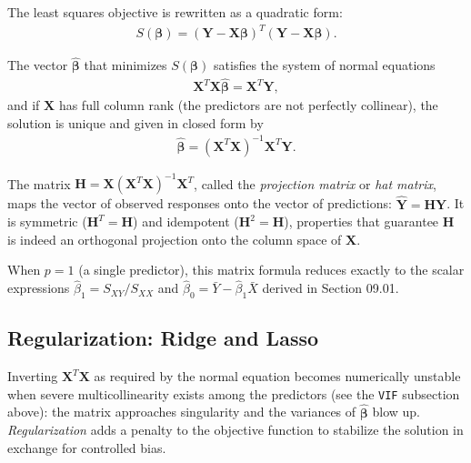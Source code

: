 The least squares objective is rewritten as a quadratic form:
\begin{align}
	S(\boldsymbol{\beta}) = (\mathbf{Y}-\mathbf{X}\boldsymbol{\beta})^T(\mathbf{Y}-\mathbf{X}\boldsymbol{\beta}).
\end{align}

\begin{teorema}
	The vector $\hat{\boldsymbol{\beta}}$ that minimizes $S(\boldsymbol{\beta})$ satisfies the system of normal equations
	\begin{align}
		\mathbf{X}^T\mathbf{X}\hat{\boldsymbol{\beta}} = \mathbf{X}^T\mathbf{Y},
	\end{align}
	and if $\mathbf{X}$ has full column rank (the predictors are not perfectly collinear), the solution is unique and given in closed form by
	\begin{align}
		\hat{\boldsymbol{\beta}} = (\mathbf{X}^T\mathbf{X})^{-1}\mathbf{X}^T\mathbf{Y}.
	\end{align}
\end{teorema}

\begin{definicion}
	The matrix $\mathbf{H}=\mathbf{X}(\mathbf{X}^T\mathbf{X})^{-1}\mathbf{X}^T$, called the \emph{projection matrix} or \emph{hat matrix}, maps the vector of observed responses onto the vector of predictions: $\hat{\mathbf{Y}}=\mathbf{H}\mathbf{Y}$. It is symmetric ($\mathbf{H}^T=\mathbf{H}$) and idempotent ($\mathbf{H}^2=\mathbf{H}$), properties that guarantee $\mathbf{H}$ is indeed an orthogonal projection onto the column space of $\mathbf{X}$.
\end{definicion}

\begin{observacion}
	When $p=1$ (a single predictor), this matrix formula reduces exactly to the scalar expressions $\hat\beta_1=S_{XY}/S_{XX}$ and $\hat\beta_0=\bar Y-\hat\beta_1\bar X$ derived in Section 09.01.
\end{observacion}

\subsection{Regularization: Ridge and Lasso}

Inverting $\mathbf{X}^T\mathbf{X}$ as required by the normal equation becomes numerically unstable when severe multicollinearity exists among the predictors (see the \texttt{VIF} subsection above): the matrix approaches singularity and the variances of $\hat{\boldsymbol{\beta}}$ blow up. \emph{Regularization} adds a penalty to the objective function to stabilize the solution in exchange for controlled bias.

